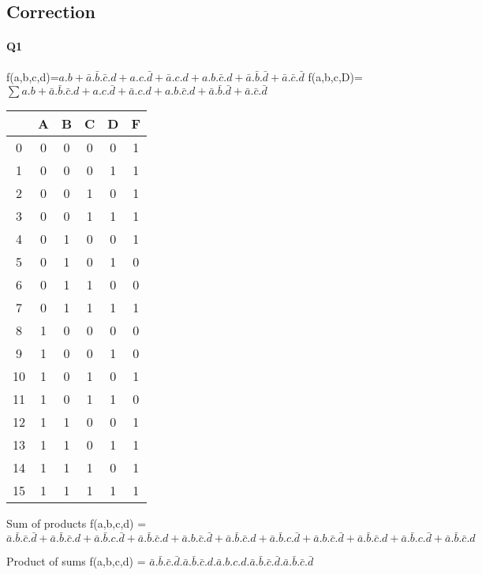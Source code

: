 \subsection{Correction}

\paragraph{Q1}

f(a,b,c,d)=$a.b+\bar a.\bar b.\bar c.d + a.c.\bar d+\bar a.c.d+a.b.\bar c.d+\bar a.\bar b.\bar d+\bar a.\bar c.\bar d$
f(a,b,c,D)=$ \sum a.b+\bar a.\bar b.\bar c.d + a.c.\bar d+\bar a.c.d+a.b.\bar c.d+\bar a.\bar b.\bar d+\bar a.\bar c.\bar d $ 

        \begin{tabular}{|c|c|c|c|c||c|}
    \toprule
         & A & B & C & D & F\\ \midrule0 & 0 & 0 & 0 & 0 & 1\\1 & 0 & 0 & 0 & 1 & 1\\2 & 0 & 0 & 1 & 0 & 1\\3 & 0 & 0 & 1 & 1 & 1\\\midrule4 & 0 & 1 & 0 & 0 & 1\\5 & 0 & 1 & 0 & 1 & 0\\6 & 0 & 1 & 1 & 0 & 0\\7 & 0 & 1 & 1 & 1 & 1\\\midrule8 & 1 & 0 & 0 & 0 & 0\\9 & 1 & 0 & 0 & 1 & 0\\10 & 1 & 0 & 1 & 0 & 1\\11 & 1 & 0 & 1 & 1 & 0\\\midrule12 & 1 & 1 & 0 & 0 & 1\\13 & 1 & 1 & 0 & 1 & 1\\14 & 1 & 1 & 1 & 0 & 1\\15 & 1 & 1 & 1 & 1 & 1\\\bottomrule
        \end{tabular}
        
Sum of products 
 f(a,b,c,d) = $\bar a.\bar b.\bar c.\bar d + \bar a.\bar b.\bar c.d + \bar a.\bar b.c.\bar d + \bar a.\bar b.\bar c.d + \bar a.b.\bar c.\bar d + \bar a.\bar b.\bar c.d + \bar a.\bar b.c.\bar d + \bar a.b.\bar c.\bar d + \bar a.\bar b.\bar c.d + \bar a.\bar b.c.\bar d + \bar a.\bar b.\bar c.d$

Product of sums 
 f(a,b,c,d) = $\bar a.\bar b.\bar c.\bar d.\bar a.\bar b.\bar c.d.\bar a.b.c.d.\bar a.\bar b.\bar c.\bar d.\bar a.\bar b.\bar c.\bar d$


